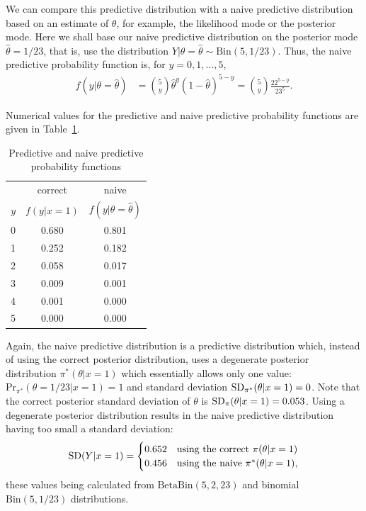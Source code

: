 We can compare this predictive distribution with a naive predictive distribution based on an estimate of $\theta$, for example, the likelihood mode or the posterior mode. Here we shall base our naive predictive distribution on the posterior mode $\hat{\theta}=1/23$, that is, use the distribution $Y|\theta=\hat\theta\sim \text{Bin}(5,1/23)$. Thus, the naive predictive probability function is, for $y=0,1,\ldots,5$,
\begin{align*}
f(y|\theta=\hat{\theta})&=\binom{5}{y}\hat{\theta}^y(1-\hat{\theta})^{5-y} 
=\binom{5}{y}\frac{22^{5-y}}{23^5}.
\end{align*}

Numerical values for the predictive and naive predictive probability functions are given in Table~\ref{tab:predbetabin}.
\begin{table}[ht]
\bigskip

\begin{tabular}{|r|c|c|}
\cline{2-3}
\multicolumn{1}{c|}{~}& correct & naive \\
\cline{1-1}
$y$ & $f(y|x=1)$ & $f(y|\theta=\hat{\theta})$ \\
\hline
0 & 0.680 & 0.801 \\
1 & 0.252 & 0.182 \\
2 & 0.058 & 0.017 \\
3 & 0.009 & 0.001 \\
4 & 0.001 & 0.000 \\
5 & 0.000 & 0.000 \\
\hline
\end{tabular}

\caption{Predictive and naive predictive probability functions}
\label{tab:predbetabin}
\end{table}
Again, the naive predictive distribution is a predictive
distribution which, instead of using the correct posterior
distribution, uses a degenerate posterior distribution
$\pi^*(\theta|x=1)$ which essentially allows only one value: $\text{Pr}_{\pi^*}(\theta=1/23|x=1)=1$ and
standard deviation $\textnormal{SD}_{\pi^*}(\theta|x=1)=0$. Note that the correct
posterior standard deviation of $\theta$ is
$\textnormal{SD}_\pi(\theta|x=1)=0.053$. Using a degenerate posterior distribution
results in the naive predictive distribution having too small a
standard deviation:
\begin{equation*}
\textnormal{SD}(Y|x=1)=
\begin{cases} 0.652 & \text{using the correct }\pi(\theta|x=1) \\
              0.456 & \text{using the naive }\pi^*(\theta|x=1), \\
\end{cases}
\end{equation*}
these values being calculated from $\text{BetaBin}(5,2,23)$ and binomial
$\text{Bin}(5,1/23)$ distributions.

